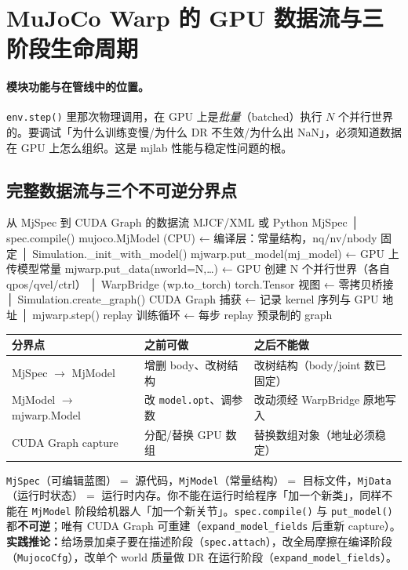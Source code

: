 \section{MuJoCo Warp 的 GPU 数据流与三阶段生命周期}
\label{sec:rlmc-phys-dataflow}

\paragraph{模块功能与在管线中的位置。}\verb|env.step()| 里那次物理调用，在 GPU 上是\emph{批量}（batched）执行 $N$ 个并行世界的。要调试「为什么训练变慢/为什么 DR 不生效/为什么出 NaN」，必须知道数据在 GPU 上怎么组织。这是 mjlab 性能与稳定性问题的根。

\subsection{完整数据流与三个不可逆分界点}

\begin{codebox}[text]{从 MjSpec 到 CUDA Graph 的数据流}
MJCF/XML 或 Python MjSpec
  │ spec.compile()
mujoco.MjModel (CPU)         ← 编译层：常量结构，nq/nv/nbody 固定
  │ Simulation._init_with_model()
mjwarp.put_model(mj_model)   ← GPU 上传模型常量
mjwarp.put_data(nworld=N,…)  ← GPU 创建 N 个并行世界（各自 qpos/qvel/ctrl）
  │ WarpBridge (wp.to_torch)
torch.Tensor 视图            ← 零拷贝桥接
  │ Simulation.create_graph()
CUDA Graph 捕获              ← 记录 kernel 序列与 GPU 地址
  │ mjwarp.step() replay
训练循环                     ← 每步 replay 预录制的 graph
\end{codebox}

\begin{center}
\small
\begin{tabular}{@{}lp{3.4cm}p{3.4cm}@{}}
\toprule
分界点 & 之前可做 & 之后不能做 \\
\midrule
MjSpec $\to$ MjModel & 增删 body、改树结构 & 改树结构（body/joint 数已固定） \\
MjModel $\to$ mjwarp.Model & 改 \verb|model.opt|、调参数 & 改动须经 WarpBridge 原地写入 \\
CUDA Graph capture & 分配/替换 GPU 数组 & 替换数组对象（地址必须稳定） \\
\bottomrule
\end{tabular}
\end{center}

\begin{insight}\label{ins:rlmc-phys-lifecycle}
\verb|MjSpec|（可编辑蓝图）$=$ 源代码，\verb|MjModel|（常量结构）$=$ 目标文件，\verb|MjData|（运行时状态）$=$ 运行时内存。你不能在运行时给程序「加一个新类」，同样不能在 \verb|MjModel| 阶段给机器人「加一个新关节」。\verb|spec.compile()| 与 \verb|put_model()| 都\textbf{不可逆}；唯有 CUDA Graph 可重建（\verb|expand_model_fields| 后重新 capture）。\textbf{实践推论：}给场景加桌子要在描述阶段（\texttt{spec.attach}），改全局摩擦在编译阶段（\texttt{MujocoCfg}），改单个 world 质量做 DR 在运行阶段（\texttt{expand\_model\_fields}）。
\end{insight}

